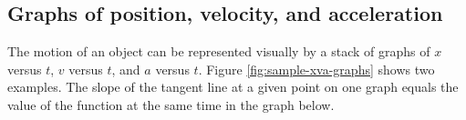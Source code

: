 \subsection{Graphs of position, velocity, and acceleration}

The motion of an object can be represented visually by a stack of graphs
of $x$ versus $t$, $v$ versus $t$, and $a$ versus $t$.
Figure \ref{fig:sample-xva-graphs} shows two examples. The slope of the tangent
line at a given point on one graph equals the value of the function at the
same time in the graph below.

